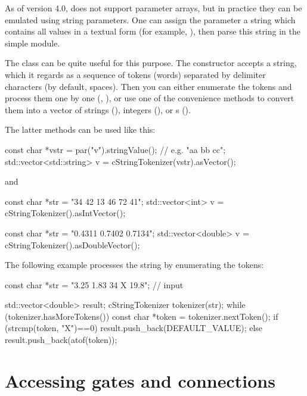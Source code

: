 As of version 4.0, {\opp} does not support parameter arrays,
but in practice they can be emulated using string parameters.
One can assign the parameter a string which contains all values
in a textual form (for example, ), then
parse this string in the simple module.

The  class can be quite useful for this
purpose. The constructor accepts a string, which it regards as
a sequence of tokens (words) separated by delimiter characters
(by default, spaces). Then you can either enumerate the tokens
and process them one by one (, ),
or use one of the  convenience methods to convert
them into a vector of strings (), integers (),
or s ().

The latter methods can be used like this:

\begin{cpp}
const char *vstr = par("v").stringValue(); // e.g. "aa bb cc";
std::vector<std::string> v = cStringTokenizer(vstr).asVector();
\end{cpp}

and

\begin{cpp}
const char *str = "34 42 13 46 72 41";
std::vector<int> v = cStringTokenizer().asIntVector();

const char *str = "0.4311 0.7402 0.7134";
std::vector<double> v = cStringTokenizer().asDoubleVector();
\end{cpp}

The following example processes the string by enumerating the tokens:

\begin{cpp}
const char *str = "3.25 1.83 34 X 19.8"; // input

std::vector<double> result;
cStringTokenizer tokenizer(str);
while (tokenizer.hasMoreTokens())
{
    const char *token = tokenizer.nextToken();
    if (strcmp(token, "X")==0)
        result.push_back(DEFAULT_VALUE);
    else
        result.push_back(atof(token));
}
\end{cpp}



\section{Accessing gates and connections}
\label{sec:simple-modules:gates}

